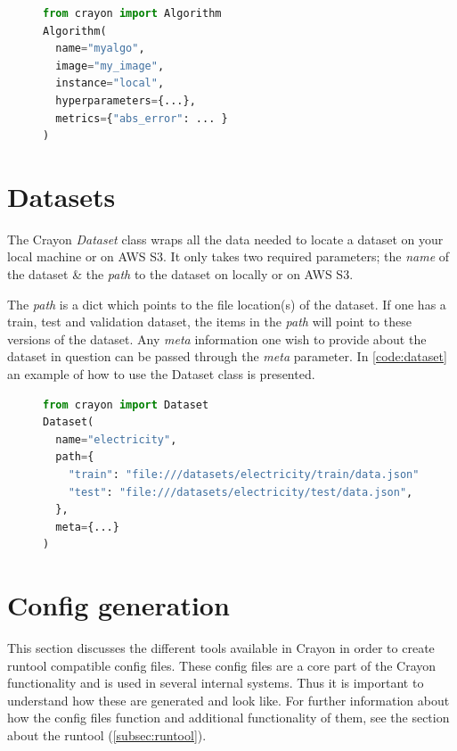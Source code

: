 \begin{figure}[h]
  \begin{lstlisting}[language=Python,label={code:algorithm},caption={Example of the Algorithm class.}]
from crayon import Algorithm
Algorithm(
  name="myalgo", 
  image="my_image", 
  instance="local",
  hyperparameters={...},
  metrics={"abs_error": ... }
)
  \end{lstlisting}

\end{figure}
\section{Datasets}
\label{crayon:datasets}
The Crayon \textit{Dataset} class wraps all the data needed to locate a dataset on your local machine or on AWS S3. It only takes two required parameters; the \textit{name} of the dataset \& the \textit{path} to the dataset on locally or on AWS S3.

The \textit{path} is a dict which points to the file location(s) of the dataset. If one has a train, test and validation dataset, the items in the \textit{path} will point to these versions of the dataset. Any \textit{meta} information one wish to provide about the dataset in question can be passed through the \textit{meta} parameter. In \ref{code:dataset} an example of how to use the Dataset class is presented.
\begin{figure}[h]
  \begin{lstlisting}[language=Python, label={code:dataset}, caption={Example of the Dataset class.}]
from crayon import Dataset
Dataset(
  name="electricity",
  path={
    "train": "file:///datasets/electricity/train/data.json",
    "test": "file:///datasets/electricity/test/data.json",
  },
  meta={...}
)
  \end{lstlisting}
\end{figure}
\section{Config generation}
\label{'subsub:config_generation'}
This section discusses the different tools available in Crayon in order to create runtool compatible config files. These config files are a core part of the Crayon functionality and is used in several internal systems. Thus it is important to understand how these are generated and look like. For further information about how the config files function and additional functionality of them, see the section about the runtool (\ref{subsec:runtool}).

